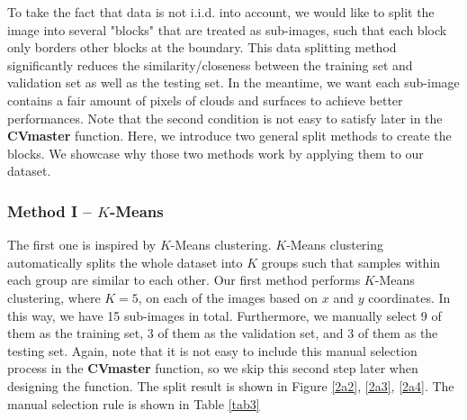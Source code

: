 \documentclass[11pt]{article}
\theoremstyle{definition}
\begin{document}
To take the fact that data is not i.i.d. into account, we would like to split the image into several "blocks" that are treated as sub-images, such that each block only borders other blocks at the boundary. This data splitting method significantly reduces the similarity/closeness between the training set and validation set as well as the testing set. In the meantime, we want each sub-image contains a fair amount of pixels of clouds and surfaces to achieve better performances. Note that the second condition is not easy to satisfy later in the \textbf{CVmaster} function. Here, we introduce two general split methods to create the blocks. We showcase why those two methods work by applying them to our dataset. 

\subsubsection*{Method I -- $K$-Means}
The first one is inspired by $K$-Means clustering. $K$-Means clustering automatically splits the whole dataset into $K$ groups such that samples within each group are similar to each other. Our first method performs $K$-Means clustering, where $K=5$, on each of the images based on $x$ and $y$ coordinates. In this way, we have 15 sub-images in total. Furthermore, we manually select 9 of them as the training set, 3 of them as the validation set, and 3 of them as the testing set. Again, note that it is not easy to include this manual selection process in the \textbf{CVmaster} function, so we skip this second step later when designing the function. The split result is shown in Figure \ref{2a2}, \ref{2a3}, \ref{2a4}. The manual selection rule is shown in Table \ref{tab3}
\end{document}
